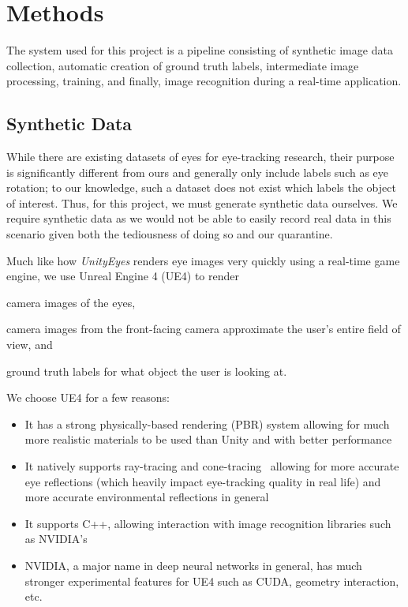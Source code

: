 \section{Methods}

The system used for this project is a pipeline consisting of synthetic image
data collection, automatic creation of ground truth labels, intermediate image
processing, training, and finally, image recognition during a real-time
application.

\subsection{Synthetic Data}

While there are existing datasets of eyes for eye-tracking research, their
purpose is significantly different from ours and generally only include labels
such as eye rotation; to our knowledge, such a dataset does not exist which
labels the object of interest. Thus, for this project, we must generate
synthetic data ourselves. We require synthetic data as we would not be able to
easily record real data in this scenario given both the tediousness of doing so
and our quarantine.

Much like how \emph{UnityEyes} renders eye images very quickly using a
real-time game engine, we use Unreal Engine 4 (UE4) to render
\begin{inlist}
\item camera images of the eyes,
\item camera images from the front-facing camera approximate the user's entire field of view, and
\item ground truth labels for what object the user is looking at.
\end{inlist}
We choose UE4 for a few reasons:

\begin{itemize}[leftmargin=*,noitemsep]
    \item
        It has a strong physically-based rendering (PBR) system allowing for
        much more realistic materials to be used than Unity and with better
        performance
    \item
        It natively supports ray-tracing and cone-tracing~\cite{???} allowing
        for more accurate eye reflections (which heavily impact eye-tracking
        quality in real life) and more accurate environmental reflections in
        general
    \item
        It supports C++, allowing interaction with image recognition libraries
        such as NVIDIA's
    \item
        NVIDIA, a major name in deep neural networks in general, has much
        stronger experimental features for UE4 such as CUDA, geometry
        interaction, etc.
\end{itemize}

